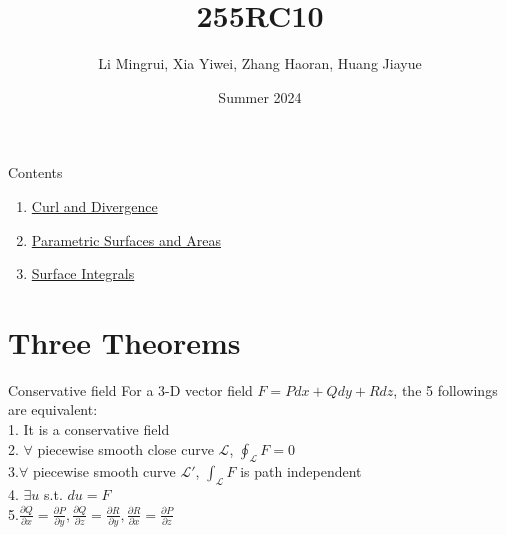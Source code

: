 \documentclass{beamer}
\title{\LARGE 255RC10}
\author{ Li Mingrui, Xia Yiwei, Zhang Haoran, Huang Jiayue}
\date{Summer 2024}
\begin{document}
\maketitle



\begin{frame}{Contents}
    \begin{enumerate}
        \item \hyperlink{1}{Curl and Divergence}
        \item \hyperlink{2}{Parametric Surfaces and Areas}
        \item \hyperlink{3}{Surface Integrals}
    \end{enumerate}
       
\end{frame}

\section{Three Theorems}
    \begin{frame}{Conservative field}
        For a 3-D vector field $F=Pdx+Qdy+Rdz$, the 5 followings are equivalent:\\
        1. It is a conservative field\\
        2. $\forall$ piecewise smooth close curve $\mathcal{L}$, $\oint_{\mathcal{L}}F=0 $\\
        3.$\forall$ piecewise smooth curve $\mathcal{L'}$, $\int_{\mathcal{L}}F$ is path independent\\
        4. $\exists u$ s.t. $du=F$\\
        5.$\frac{\partial Q}{\partial x}=\frac{\partial P}{\partial y}, \frac{\partial Q}{\partial z}=\frac{\partial R}{\partial y}, \frac{\partial R}{\partial x}=\frac{\partial P}{\partial z}$
    \end{frame}
\end{document}
